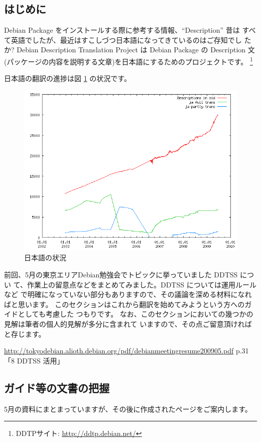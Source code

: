 \documentclass[mingoth,a4paper]{jsarticle}
\begin{document}

\subsection{はじめに}


Debian Package をインストールする際に参考する情報、``Description'' 昔は
すべて英語でしたが、最近はすこしづつ日本語になってきているのはご存知でし
たか?
Debian Description Translation Project は Debian Package の Description
文(パッケージの内容を説明する文章)を日本語にするためのプロジェクトです。
\footnote{DDTPサイト: \url{http://ddtp.debian.net/}}

日本語の翻訳の進捗は図 \ref{fig:transstatja} の状況です。

\begin{figure}[h]
\includegraphics[width=0.5\hsize]{image200906/stat-trans-sid-ja.png}
\caption{日本語の状況}
\label{fig:transstatja}
\end{figure}

前回、5月の東京エリアDebian勉強会でトピックに挙っていました DDTSS につい
て、作業上の留意点などをまとめてみました。DDTSS については運用ルールなど
で明確になっていない部分もありますので、その議論を深める材料になればと思います。
このセクションはこれから翻訳を始めてみようという方へのガイドとしても考慮した
つもりです。
なお、このセクションにおいての幾つかの見解は筆者の個人的見解が多分に含まれて
いますので、その点ご留意頂ければと存じます。

\url{http://tokyodebian.alioth.debian.org/pdf/debianmeetingresume200905.pdf}
 p.31「8 DDTSS 活用」

\subsection{ガイド等の文書の把握}
5月の資料にまとまっていますが、その後に作成されたページをご案内します。
\end{document}
